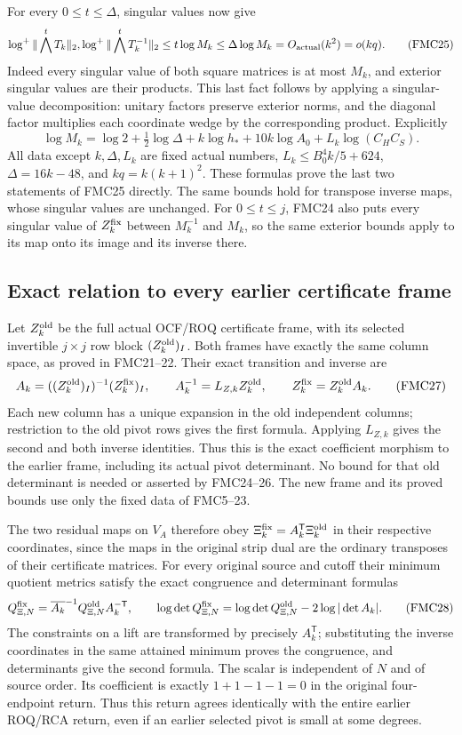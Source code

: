 \documentclass[11pt,a4paper]{article}
\begin{document}
For every $0\le t\le\Delta$, singular values now give
\[
 \log^+\|\bigwedge^t T_k\|_2,
 \log^+\|\bigwedge^t T_k^{-1}\|_2
       \le t\log M_k\le\Delta\log M_k
       =O_{\rm actual}(k^2)=o(kq).
 \tag{FMC25}
\]
Indeed every singular value of both square matrices is at most
$M_k$, and exterior singular values are their products. This last
fact follows by applying a singular-value decomposition: unitary
factors preserve exterior norms, and the diagonal factor multiplies
each coordinate wedge by the corresponding product. Explicitly
\[
 \log M_k=\log2+\tfrac12\log\Delta+k\log h_*
              +10k\log A_0+L_k\log(C_HC_S).
 \tag{FMC26}
\]
All data except $k,\Delta,L_k$ are fixed actual numbers,
$L_k\le B_0^4 k/5+624$, $\Delta=16k-48$, and
$kq=k(k+1)^2$. These formulas prove the last two statements of
FMC25 directly. The same bounds hold for transpose inverse maps,
whose singular values are unchanged. For $0\le t\le j$, FMC24
also puts every singular value of $Z_k^{\rm fix}$ between
$M_k^{-1}$ and $M_k$, so the same exterior bounds apply to its
map onto its image and its inverse there.

\subsection{Exact relation to every earlier certificate frame}

Let $Z_k^{\rm old}$ be the full actual OCF/ROQ certificate frame,
with its selected invertible $j\times j$ row block
$(Z_k^{\rm old})_I$. Both frames have exactly the same column
space, as proved in FMC21--22. Their exact transition and inverse are
\[
 A_k=((Z_k^{\rm old})_I)^{-1}(Z_k^{\rm fix})_I,
 \qquad A_k^{-1}=L_{Z,k}Z_k^{\rm old},\qquad
 Z_k^{\rm fix}=Z_k^{\rm old}A_k.
 \tag{FMC27}
\]
Each new column has a unique expansion in the old independent columns;
restriction to the old pivot rows gives the first formula. Applying
$L_{Z,k}$ gives the second and both inverse identities. Thus this
is the exact coefficient morphism to the earlier frame, including
its actual pivot determinant. No bound for that old determinant
is needed or asserted by FMC24--26. The new frame and its proved
bounds use only the fixed data of FMC5--23.

The two residual maps on $V_A$ therefore obey
$\Xi_k^{\rm fix}=A_k^{\mathsf T}\Xi_k^{\rm old}$ in their
respective coordinates, since the maps in the original strip dual
are the ordinary transposes of their certificate matrices.
For every original source and cutoff their minimum quotient metrics
satisfy the exact congruence and determinant formulas
\[
 Q_{\Xi,N}^{\rm fix}
        =\overline{A_k}^{-1}Q_{\Xi,N}^{\rm old}A_k^{-\mathsf T},
 \qquad
 \log\det Q_{\Xi,N}^{\rm fix}
        =\log\det Q_{\Xi,N}^{\rm old}-2\log|\det A_k|.
 \tag{FMC28}
\]
The constraints on a lift are transformed by precisely
$A_k^{\mathsf T}$; substituting the inverse coordinates in the
same attained minimum proves the congruence, and determinants give
the second formula. The scalar is independent of $N$ and of source
order. Its coefficient is exactly $1+1-1-1=0$ in the original
four-endpoint return. Thus this return agrees identically with the
entire earlier ROQ/RCA return, even if an earlier selected pivot is
small at some degrees.
\end{document}
